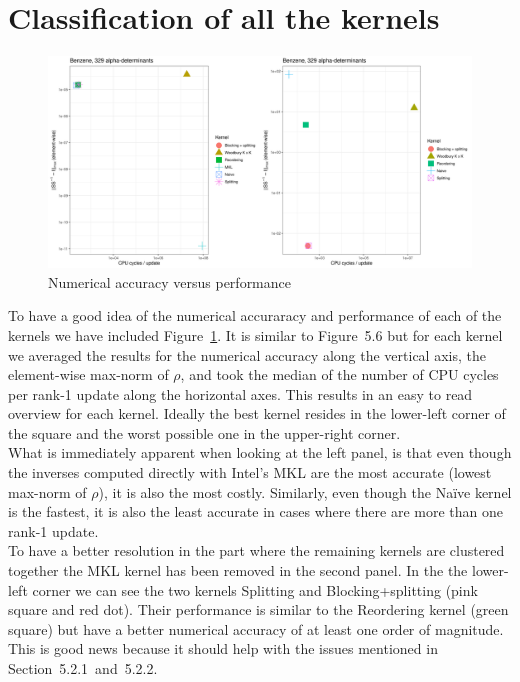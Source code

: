 \documentclass[11pt]{article}
\numberwithin{figure}{section}
\numberwithin{table}{section}
\begin{document}
  \section{Classification of all the kernels}
  
    \begin{figure}[H]
      \centering
      \includegraphics[width=1\textwidth]{Pareto_passfail_mean.png}
      \caption{Numerical accuracy versus performance}
      \label{fig:Pareto_passfail_mean}
    \end{figure}
    
    To have a good idea of the numerical accuraracy and performance of each of the kernels we have included Figure~\ref{fig:Pareto_passfail_mean}. It is similar to Figure~5.6 but for each kernel we averaged the results for the numerical accuracy along the vertical axis, the element-wise max-norm of $\rho$, and took the median of the number of CPU cycles per rank-1 update along the horizontal axes. This results in an easy to read overview for each kernel. Ideally the best kernel resides in the lower-left corner of the square and the worst possible one in the upper-right corner.\\
    
    What is immediately apparent when looking at the left panel, is that even though the inverses computed directly with Intel's MKL are the most accurate (lowest max-norm of $\rho$), it is also the most costly. Similarly, even though the Na\"{i}ve kernel is the fastest, it is also the least accurate in cases where there are more than one rank-1 update.\\
    
    To have a better resolution in the part where the remaining kernels are clustered together the MKL kernel has been removed in the second panel. In the the lower-left corner we can see the two kernels Splitting and Blocking+splitting (pink square and red dot). Their performance is similar to the Reordering kernel (green square) but have a better numerical accuracy of at least one order of magnitude. This is good news because it should help with the issues mentioned in Section~5.2.1~and~5.2.2.\\
    
\end{document}
